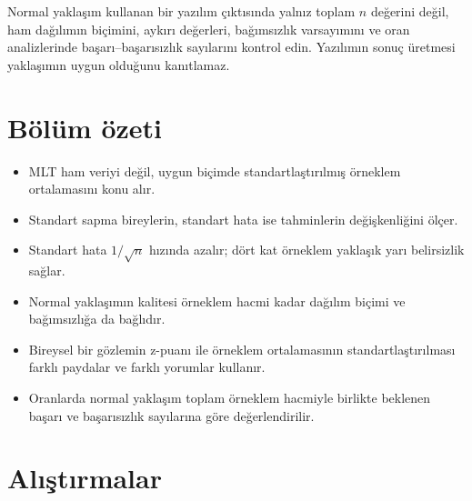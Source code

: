 \begin{outputguidebox}
Normal yaklaşım kullanan bir yazılım çıktısında yalnız toplam $n$ değerini
değil, ham dağılımın biçimini, aykırı değerleri, bağımsızlık varsayımını ve
oran analizlerinde başarı--başarısızlık sayılarını kontrol edin. Yazılımın
sonuç üretmesi yaklaşımın uygun olduğunu kanıtlamaz.
\end{outputguidebox}





\section{Bölüm özeti}

\begin{itemize}
  \item MLT ham veriyi değil, uygun biçimde standartlaştırılmış örneklem ortalamasını konu alır.
  \item Standart sapma bireylerin, standart hata ise tahminlerin değişkenliğini ölçer.
  \item Standart hata $1/\sqrt n$ hızında azalır; dört kat örneklem yaklaşık yarı belirsizlik sağlar.
  \item Normal yaklaşımın kalitesi örneklem hacmi kadar dağılım biçimi ve bağımsızlığa da bağlıdır.
  \item Bireysel bir gözlemin z-puanı ile örneklem ortalamasının
  standartlaştırılması farklı paydalar ve farklı yorumlar kullanır.
  \item Oranlarda normal yaklaşım toplam örneklem hacmiyle birlikte beklenen
  başarı ve başarısızlık sayılarına göre değerlendirilir.
\end{itemize}

\section*{Alıştırmalar}

